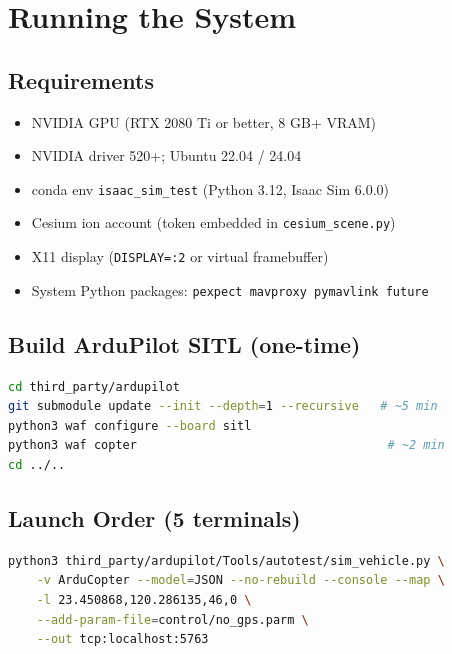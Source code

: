 \documentclass[11pt,a4paper]{article}
\begin{document}
\section{Running the System}
\label{sec:quickstart}

\subsection*{Requirements}

\begin{itemize}
  \item NVIDIA GPU (RTX 2080 Ti or better, 8 GB+ VRAM)
  \item NVIDIA driver 520+; Ubuntu 22.04 / 24.04
  \item conda env \texttt{isaac\_sim\_test} (Python 3.12, Isaac Sim 6.0.0)
  \item Cesium ion account (token embedded in \texttt{cesium\_scene.py})
  \item X11 display (\texttt{DISPLAY=:2} or virtual framebuffer)
  \item System Python packages: \texttt{pexpect mavproxy pymavlink future}
\end{itemize}

\subsection*{Build ArduPilot SITL (one-time)}

\begin{lstlisting}[language=bash, numbers=none]
cd third_party/ardupilot
git submodule update --init --depth=1 --recursive   # ~5 min
python3 waf configure --board sitl
python3 waf copter                                   # ~2 min
cd ../..
\end{lstlisting}

\subsection*{Launch Order (5 terminals)}

\begin{lstlisting}[language=bash, numbers=none, caption={Terminal 1 --- ArduPilot SITL}]
python3 third_party/ardupilot/Tools/autotest/sim_vehicle.py \
    -v ArduCopter --model=JSON --no-rebuild --console --map \
    -l 23.450868,120.286135,46,0 \
    --add-param-file=control/no_gps.parm \
    --out tcp:localhost:5763
\end{lstlisting}
\end{document}
